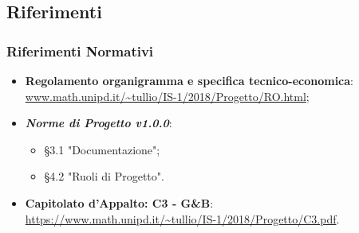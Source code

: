 \subsection{Riferimenti}
\subsubsection{Riferimenti Normativi}
\begin{itemize}
	\item \textbf{Regolamento organigramma e specifica tecnico-economica}:\-\\ \url{www.math.unipd.it/~tullio/IS-1/2018/Progetto/RO.html};
	\item \textbf{\textit{Norme di Progetto v1.0.0}}:
		\begin{itemize}
			\item §3.1 "Documentazione";
			\item §4.2 "Ruoli di Progetto".
		\end{itemize}
	\item \textbf{Capitolato d'Appalto: C3 - G\&B}:\-\\ \url{https://www.math.unipd.it/~tullio/IS-1/2018/Progetto/C3.pdf}.
\end{itemize}

